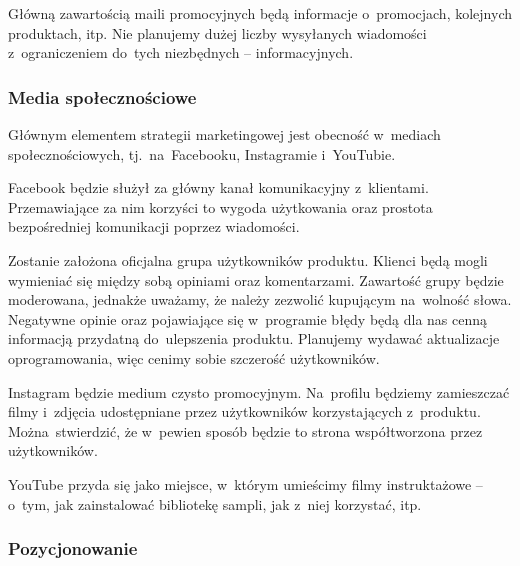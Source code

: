 \documentclass[12pt]{article}
\begin{document}
Główną zawartością maili promocyjnych będą informacje o~promocjach, kolejnych produktach, itp.
Nie planujemy dużej liczby wysyłanych wiadomości z~ograniczeniem do~tych niezbędnych -- informacyjnych.

\subsubsection{Media społecznościowe}

Głównym elementem strategii marketingowej jest obecność w~mediach społecznościowych, tj.~na~Facebooku, Instagramie i~YouTubie.

Facebook będzie służył za główny kanał komunikacyjny z~klientami.
Przemawiające za nim korzyści to wygoda użytkowania oraz prostota bezpośredniej komunikacji poprzez wiadomości.


Zostanie założona oficjalna grupa użytkowników produktu.
Klienci będą mogli wymieniać się między sobą opiniami oraz komentarzami.
Zawartość grupy będzie moderowana, jednakże uważamy, że należy zezwolić kupującym na~wolność słowa.
Negatywne opinie oraz pojawiające się w~programie błędy będą dla nas cenną informacją przydatną do~ulepszenia produktu.
Planujemy wydawać aktualizacje oprogramowania, więc cenimy sobie szczerość użytkowników.

Instagram będzie medium czysto promocyjnym.
Na~profilu będziemy zamieszczać filmy i~zdjęcia udostępniane przez użytkowników korzystających z~produktu.
Można~stwierdzić, że w~pewien sposób będzie to strona współtworzona przez użytkowników.

YouTube przyda się jako miejsce, w~którym umieścimy filmy instruktażowe -- o~tym, jak zainstalować bibliotekę sampli, jak z~niej korzystać, itp.


\subsubsection{Pozycjonowanie}
\end{document}
